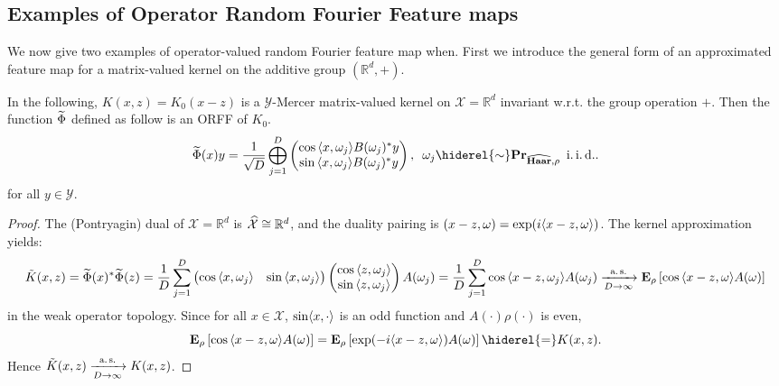 \subsection{Examples of Operator Random Fourier Feature maps}
We now give two examples of operator-valued random Fourier feature map when. First we introduce the general form of an approximated feature map for a matrix-valued kernel on the additive group $(\mathbb{R}^d,+)$.
\begin{example}\label{ex:additive_group}
In the following, $K(x,z)=K_0(x-z)$ is a $\mathcal{Y}$-Mercer matrix-valued kernel on $\mathcal{X}=\mathbb{R}^d$ invariant w.r.t. the group operation $+$. %
Then the function $\widetilde{\Phi}$ defined as follow is an \acl{ORFF} of $K_{0}$.
\begin{dmath*}
\tildePhi{\omega}(x)y=\frac{1}{\sqrt{D}}\Vect_{j=1}^D\begin{pmatrix}\cos{\inner{x,\omega_j}}B(\omega_j)^\adjoint y \\ \sin{\inner{x,\omega_j}}B(\omega_j)^\adjoint y\end{pmatrix}, \enskip \omega_j \hiderel{\sim} \probability_{\dual{\Haar},\rho} \enskip\text{\iid}.
\end{dmath*}
for all $y\in\mathcal{Y}$.
\end{example}
\begin{proof}
The (Pontryagin) dual of $\mathcal{X}=\mathbb{R}^d$
is $\widehat{\mathcal{X}}\cong\mathbb{R}^d$, and the duality pairing is $(x-z,\omega)=\exp(i\langle x-z, \omega\rangle)$. The kernel approximation yields:
\begin{dmath*}
\tilde{K}(x,z)=\tildePhi{\omega}(x)^\adjoint \tildePhi{\omega}(z)
= \frac{1}{D} \sum_{j=1}^D \begin{pmatrix} \cos{\inner{x,\omega_j}} & \sin{\inner{x,\omega_j}} \end{pmatrix}\begin{pmatrix}\cos{\inner{z,\omega_j}} \\ \sin{\inner{z,\omega_j}} \end{pmatrix} A(\omega_j)
= \frac{1}{D} \sum_{j=1}^D \cos{\inner{x-z,\omega_j}}A(\omega_j) \\
\converges{\asurely}{D\to\infty}\expectation_\rho\left[\cos{\inner{x-z,\omega}}A(\omega)\right]
\end{dmath*}
in the weak operator topology. Since for all $x\in\mathcal{X}$, $\sin\langle x, \cdot\rangle$ is an odd function and $A(\cdot)\rho(\cdot)$ is even,
\begin{dmath*}
\expectation_\rho\left[\cos{\inner{x-z,\omega}}A(\omega)\right]=\expectation_\rho\left[\exp(-i\inner{x-z,\omega})A(\omega)\right]\hiderel{=}K(x,z).
\end{dmath*}
Hence $\tilde{K}(x,z)\xrightarrow[D\to\infty]{\text{a.\,s.}}K(x,z)$.
\end{proof}
